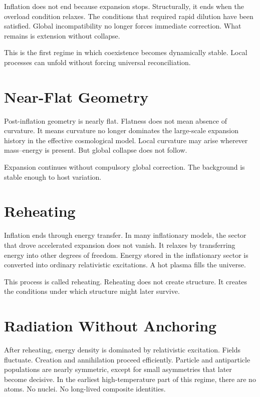 \documentclass[11pt,twoside,openright]{book}
\begin{document}
Inflation does not end because expansion stops. Structurally, it ends when the overload condition relaxes. The conditions that required rapid dilution have been satisfied. Global incompatibility no longer forces immediate correction. What remains is extension without collapse.

This is the first regime in which coexistence becomes dynamically stable. Local processes can unfold without forcing universal reconciliation.

\section*{Near-Flat Geometry}

Post-inflation geometry is nearly flat. Flatness does not mean absence of curvature. It means curvature no longer dominates the large-scale expansion history in the effective cosmological model. Local curvature may arise wherever mass--energy is present. But global collapse does not follow.

Expansion continues without compulsory global correction. The background is stable enough to host variation.

\section*{Reheating}

Inflation ends through energy transfer. In many inflationary models, the sector that drove accelerated expansion does not vanish. It relaxes by transferring energy into other degrees of freedom. Energy stored in the inflationary sector is converted into ordinary relativistic excitations. A hot plasma fills the universe.

This process is called reheating. Reheating does not create structure. It creates the conditions under which structure might later survive.

\section*{Radiation Without Anchoring}

After reheating, energy density is dominated by relativistic excitation. Fields fluctuate. Creation and annihilation proceed efficiently. Particle and antiparticle populations are nearly symmetric, except for small asymmetries that later become decisive. In the earliest high-temperature part of this regime, there are no atoms. No nuclei. No long-lived composite identities.
\end{document}
